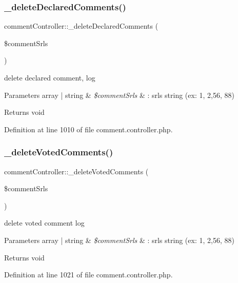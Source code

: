 \subsubsection{\texorpdfstring{\+\_\+delete\+Declared\+Comments()}{\_deleteDeclaredComments()}}
{\footnotesize\ttfamily comment\+Controller\+::\+\_\+delete\+Declared\+Comments (\begin{DoxyParamCaption}\item[{}]{\$comment\+Srls }\end{DoxyParamCaption})}

delete declared comment, log 
\begin{DoxyParams}[1]{Parameters}
array | string & {\em \$comment\+Srls} & \+: srls string (ex\+: 1, 2,56, 88) \\
\hline
\end{DoxyParams}
\begin{DoxyReturn}{Returns}
void 
\end{DoxyReturn}


Definition at line 1010 of file comment.\+controller.\+php.

\hypertarget{classcommentController_a0e4216451f3bb1c02aeec98bb4f54ddc}{}\label{classcommentController_a0e4216451f3bb1c02aeec98bb4f54ddc} 
\subsubsection{\texorpdfstring{\+\_\+delete\+Voted\+Comments()}{\_deleteVotedComments()}}
{\footnotesize\ttfamily comment\+Controller\+::\+\_\+delete\+Voted\+Comments (\begin{DoxyParamCaption}\item[{}]{\$comment\+Srls }\end{DoxyParamCaption})}

delete voted comment log 
\begin{DoxyParams}[1]{Parameters}
array | string & {\em \$comment\+Srls} & \+: srls string (ex\+: 1, 2,56, 88) \\
\hline
\end{DoxyParams}
\begin{DoxyReturn}{Returns}
void 
\end{DoxyReturn}


Definition at line 1021 of file comment.\+controller.\+php.

